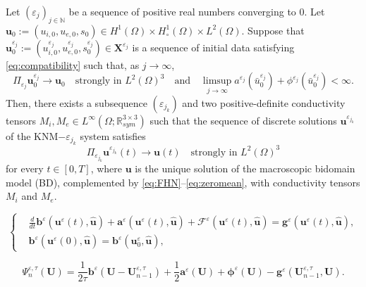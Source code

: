 \documentclass[10pt,a4paper]{amsart}
\newcommand{\R}{\mathbb{R}}
\newcommand{\e}{\varepsilon}
\begin{document}
\begin{theorem}
	\label{th:main}
	Let $(\e_j)_{j\in \mathbb{N}}$ be a sequence of positive real numbers converging to $0$. Let $\mathbf{u}_0 := (u_{i,0}, u_{e,0}, s_0) \in H^1(\Omega) \times H_\circ^1(\Omega) \times L^2(\Omega)$. Suppose that $\mathbf{u}_0^{\varepsilon_j} := (u_{i,0}^{\varepsilon_j}, u_{e,0}^{\varepsilon_j}, s_0^{\varepsilon_j}) \in \mathbf{X}^{\varepsilon_j}$ is a sequence of initial data satisfying \eqref{eq:compatibility} such that, as $j \to \infty$, 
	\[
	\Pi_{\varepsilon_j}\mathbf{u}_0^{\varepsilon_j} \to \mathbf{u}_0\quad \text{strongly in } L^2(\Omega)^3\quad \text{and}\quad
	\limsup_{j\to \infty} a^{\varepsilon_j}(\bar u_0^{\varepsilon_j}) +\phi^{\varepsilon_j}(\bar u_0^{\varepsilon_j}) < \infty. 
	\]
	Then, there exists a subsequence $(\e_{j_k})$ and two positive-definite conductivity tensors $M_i, M_e \in L^\infty(\Omega;  \R^{3 \times 3}_{sym})$ such that the sequence of discrete solutions $\mathbf{u}^{\varepsilon_{j_k}}$ of the KNM$-\varepsilon_{j_k}$ system satisfies 
	\[
	\Pi_{\varepsilon_{j_k}}\mathbf{u}^{\varepsilon_{j_k}}(t) \to \mathbf{u}(t)\quad \text{strongly in } L^2(\Omega)^3
	\] 
	for every $t \in [0,T]$, where $\mathbf{u}$ is the unique solution of the macroscopic bidomain model (BD), complemented by \eqref{eq:FHN}--\eqref{eq:zeromean}, with conductivity tensors $M_i$ and $M_e$.
\end{theorem}

\begin{equation}
	\label{KNM-abstract}
	\left\{
	\begin{aligned}
		&\frac{d}{dt} \mathbf{b}^\e(\mathbf{u}^\e(t), \widehat{\mathbf{u}}) 
		+ \mathbf{a}^\e(\mathbf{u}^\e(t), \widehat{\mathbf{u}}) 
		+ 	\mathcal{F}^\e(\mathbf{u}^\e(t), \widehat{\mathbf{u}}) = \mathbf{g}^\e(\mathbf{u}^\e(t), \widehat{\mathbf{u}}), \\
		&\mathbf{b}^\e(\mathbf{u}^\e(0), \widehat{\mathbf{u}}) = \mathbf{b}^\e(\mathbf{u}_0^\e, \widehat{\mathbf{u}}),
	\end{aligned}
	\right.
\end{equation}

\begin{equation}
	\label{MM-eps}
	\Psi_{n}^{\e,\tau}(\mathbf{U}) = \frac{1}{2\tau} \mathbf{b}^\e\left(\mathbf{U} - \mathbf{U}_{n-1}^{\e,\tau}\right) + \frac{1}{2} \mathbf{a}^\e(\mathbf{U}) + \mathbf{\phi}^\e(\mathbf{U}) - \mathbf{g}^\e\left(\mathbf{U}_{n-1}^{\e,\tau}, \mathbf{U}\right).
\end{equation}
\end{document}

